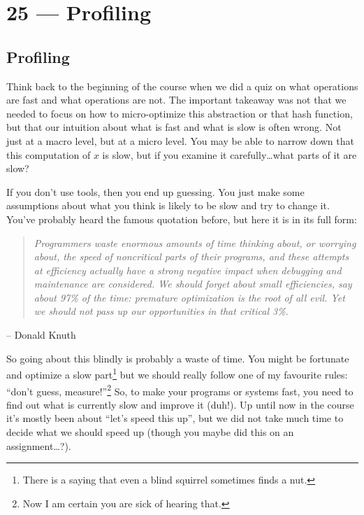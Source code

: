 \documentclass[a4paper]{report}
\begin{document}
\chapter*{25 --- Profiling}


\section*{Profiling}

Think back to the beginning of the course when we did a quiz on what operations are fast and what operations are not. The important takeaway was not that we needed to focus on how to micro-optimize this abstraction or that hash function, but that our intuition about what is fast and what is slow is often wrong. Not just at a macro level, but at a micro level. You may be able to narrow down that this computation of $x$ is slow, but if you examine it carefully\ldots what parts of it are slow?

If you don't use tools, then you end up guessing. You just make some assumptions about what you think is likely to be slow and try to change it. You've probably heard the famous quotation before, but here it is in its full form:

\begin{quote}
\textit{Programmers waste enormous amounts of time thinking about, or worrying about, the speed of noncritical parts of their programs, and these attempts at efficiency actually have a strong negative impact when debugging and maintenance are considered. We should forget about small efficiencies, say about 97\% of the time: premature optimization is the root of all evil. Yet we should not pass up our opportunities in that critical 3\%.}
\end{quote}
	\hfill -- Donald Knuth

So going about this blindly is probably a waste of time. You might be fortunate and optimize a slow part\footnote{There is a saying that even a blind squirrel sometimes finds a nut.} but we should really follow one of my favourite rules: ``don't guess, measure!''\footnote{Now I am certain you are sick of hearing that.} So, to make your programs or systems fast, you need to find out what is currently slow and improve it (duh!). Up until now in the course it's mostly been about ``let's speed this up'', but we did not take much time to decide what we should speed up (though you maybe did this on an assignment\ldots?).
\end{document}
